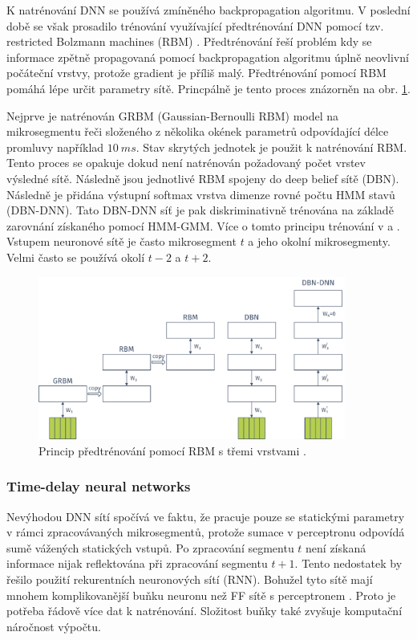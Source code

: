 K natrénování DNN se používá zmíněného backpropagation algoritmu. V poslední době se však prosadilo trénování využívající předtrénování DNN pomocí tzv. restricted Bolzmann machines (RBM) \cite{Hinton2012}. Předtrénování řeší problém kdy se informace zpětně propagovaná pomocí backpropagation algoritmu úplně neovlivní počáteční vrstvy, protože gradient je příliš malý. Předtrénování pomocí RBM pomáhá lépe určit parametry sítě. Princpálně je tento proces znázorněn na obr. \ref{fig:asr:acoustic:dnn:pretraining}.

Nejprve je natrénován GRBM (Gaussian-Bernoulli RBM) model na mikrosegmentu řeči složeného z několika okének parametrů odpovídající délce promluvy například $10\ ms$. Stav skrytých jednotek je použit k natrénování RBM. Tento proces se opakuje dokud není natrénován požadovaný počet vrstev výsledné sítě. Následně jsou jednotlivé RBM spojeny do deep belief sítě (DBN). Následně je přidána výstupní softmax vrstva dimenze rovné počtu HMM stavů (DBN-DNN). Tato DBN-DNN síť je pak diskriminativně trénována na základě zarovnání získaného pomocí HMM-GMM. Více o tomto principu trénování v \cite{Hinton2012} a \cite{Vesely2013}. Vstupem neuronové sítě je často mikrosegment $t$ a jeho okolní mikrosegmenty. Velmi často se používá okolí $t-2$ a $t+2$.

\begin{figure}[hbpt]
  \centering
  \includegraphics[width=0.9\textwidth]{./ch4-asr/img/pretraining.pdf}
  \caption{Princip předtrénování pomocí RBM s třemi vrstvami \cite{Hinton2012}.}
  \label{fig:asr:acoustic:dnn:pretraining}
\end{figure}

\subsubsection{Time-delay neural networks}

Nevýhodou DNN sítí spočívá ve faktu, že pracuje pouze se statickými parametry v rámci zpracovávaných mikrosegmentů, protože sumace v perceptronu odpovídá sumě vážených statických vstupů. Po zpracování segmentu $t$ není získaná informace nijak reflektována při zpracování segmentu $t+1$. Tento nedostatek by řešilo použití rekurentních neuronových sítí (RNN). Bohužel tyto sítě mají mnohem komplikovanější buňku neuronu než FF sítě s perceptronem \cite{Amodei2016}. Proto je potřeba řádově více dat k natrénování. Složitost buňky také zvyšuje komputační náročnost výpočtu.


